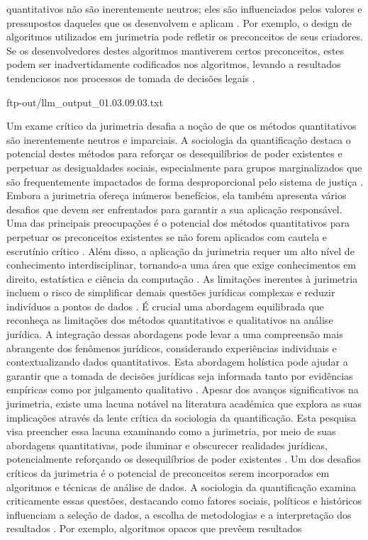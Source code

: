quantitativos não são inerentemente neutros; eles são influenciados pelos valores e pressupostos daqueles que os desenvolvem e aplicam \cite{brown2019}. Por exemplo, o design de algoritmos utilizados em jurimetria pode refletir os preconceitos de seus criadores. Se os desenvolvedores destes algoritmos mantiverem certos preconceitos, estes podem ser inadvertidamente codificados nos algoritmos, levando a resultados tendenciosos nos processos de tomada de decisões legais \cite{brown2019}. 

ftp-out/llm_output_01.03.09.03.txt 

Um exame crítico da jurimetria desafia a noção de que os métodos quantitativos são inerentemente neutros e imparciais. A sociologia da quantificação destaca o potencial destes métodos para reforçar os desequilíbrios de poder existentes e perpetuar as desigualdades sociais, especialmente para grupos marginalizados que são frequentemente impactados de forma desproporcional pelo sistema de justiça \cite{10.5040/9781350220645,10.1590/dados.2022.65.3.267}. Embora a jurimetria ofereça inúmeros benefícios, ela também apresenta vários desafios que devem ser enfrentados para garantir a sua aplicação responsável. Uma das principais preocupações é o potencial dos métodos quantitativos para perpetuar os preconceitos existentes se não forem aplicados com cautela e escrutínio crítico \cite{ccdacdfbcdaf,efbfffafaacadd}. Além disso, a aplicação da jurimetria requer um alto nível de conhecimento interdisciplinar, tornando-a uma área que exige conhecimentos em direito, estatística e ciência da computação \cite{ccdacdfbcdaf,efbfffafaacadd}. As limitações inerentes à jurimetria incluem o risco de simplificar demais questões jurídicas complexas e reduzir indivíduos a pontos de dados \cite{10.1590/dados.2022.65.3.267,10.1080/07329113.2015.1046739}. É crucial uma abordagem equilibrada que reconheça as limitações dos métodos quantitativos e qualitativos na análise jurídica. A integração dessas abordagens pode levar a uma compreensão mais abrangente dos fenômenos jurídicos, considerando experiências individuais e contextualizando dados quantitativos. Esta abordagem holística pode ajudar a garantir que a tomada de decisões jurídicas seja informada tanto por evidências empíricas como por julgamento qualitativo \cite{mendes2016}. Apesar dos avanços significativos na jurimetria, existe uma lacuna notável na literatura académica que explora as suas implicações através da lente crítica da sociologia da quantificação. Esta pesquisa visa preencher essa lacuna examinando como a jurimetria, por meio de suas abordagens quantitativas, pode iluminar e obscurecer realidades jurídicas, potencialmente reforçando os desequilíbrios de poder existentes \cite{10.1590/dados.2022.65.3.267,10.1080/07329113.2015.1046739}. Um dos desafios críticos da jurimetria é o potencial de preconceitos serem incorporados em algoritmos e técnicas de análise de dados. A sociologia da quantificação examina criticamente essas questões, destacando como fatores sociais, políticos e históricos influenciam a seleção de dados, a escolha de metodologias e a interpretação dos resultados \cite{10.1590/dados.2022.65.3.267,10.1057/s41599-020 -0396-5}. Por exemplo, algoritmos opacos que prevêem resultados 